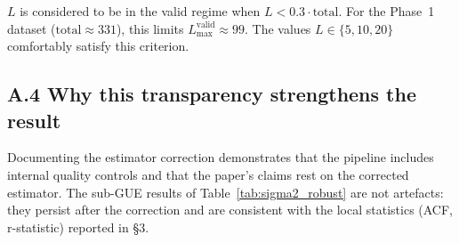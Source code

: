 \documentclass[12pt, a4paper]{article}
\begin{document}
$L$ is considered to be in the valid regime when $L < 0.3 \cdot \text{total}$.
For the Phase~1 dataset ($\text{total} \approx 331$), this limits
$L_\text{max}^\text{valid} \approx 99$. The values $L \in \{5, 10, 20\}$
comfortably satisfy this criterion.

\subsection*{A.4 Why this transparency strengthens the result}

Documenting the estimator correction demonstrates that the pipeline
includes internal quality controls and that the paper's claims rest on
the corrected estimator. The sub-GUE results of Table~\ref{tab:sigma2_robust}
are not artefacts: they persist after the correction and are consistent
with the local statistics (ACF, r-statistic) reported in \S3.
\end{document}
